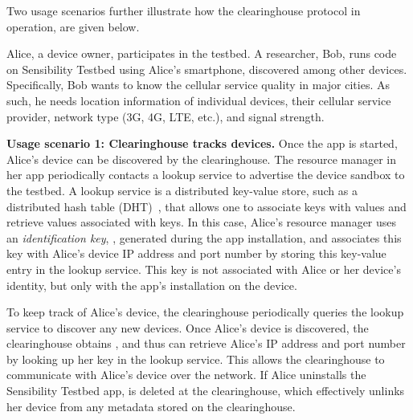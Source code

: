 {{Two usage scenarios further illustrate how the clearinghouse 
protocol in operation, are given below.

\smallskip

Alice, a device owner, participates in the testbed. A researcher, Bob, 
runs code on Sensibility Testbed using Alice's smartphone, discovered among other
devices. Specifically, Bob wants to know the cellular service
quality in major cities. As such, he needs location information
of individual devices, their cellular service provider, network
type (3G, 4G, LTE, etc.), and signal strength. 

\textbf{Usage scenario 1: Clearinghouse tracks devices.}
Once the app is started, Alice's device can be discovered by 
the clearinghouse. The resource manager in her app periodically contacts 
a lookup service to advertise the device sandbox to the testbed. 
A lookup service is a distributed key-value store, such as a 
distributed hash table (DHT)~\cite{dht}, that allows one to associate 
keys with values and retrieve values associated with keys. In this case, 
Alice's resource manager uses an \textit{identification key}, , 
generated during the app installation, and associates this key 
with Alice's device IP address and port number by 
storing this key-value entry in the lookup service. This key is not 
associated with Alice or her device's identity, but only with the app's 
installation on the device. 


To keep track of Alice's device, the
clearinghouse periodically queries the lookup service to
discover any new devices. Once Alice's device is discovered, the
clearinghouse obtains , and thus
can retrieve Alice's  IP address and port number by 
looking up her key in the lookup service. This allows the clearinghouse
to communicate with Alice's device over the network.
If Alice uninstalls the Sensibility Testbed app, 
 is deleted at the clearinghouse, which effectively unlinks
her device from any metadata stored on the clearinghouse.

}}
